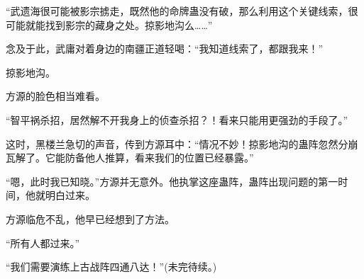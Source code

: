 \begin{this_body}
“武遗海很可能被影宗掳走，既然他的命牌蛊没有破，那么利用这个关键线索，很可能就能找到影宗的藏身之处。掠影地沟么……”

念及于此，武庸对着身边的南疆正道轻喝：“我知道线索了，都跟我来！”

掠影地沟。

方源的脸色相当难看。

“智平祸杀招，居然解不开我身上的侦查杀招？！看来只能用更强劲的手段了。”

这时，黑楼兰急切的声音，传到方源耳中：“情况不妙！掠影地沟的蛊阵忽然分崩瓦解了。它能防备他人推算，看来我们的位置已经暴露。”

“嗯，此时我已知晓。”方源并无意外。他执掌这座蛊阵，蛊阵出现问题的第一时间，他就明白过来。

方源临危不乱，他早已经想到了方法。

“所有人都过来。”

“我们需要演练上古战阵四通八达！”(未完待续。)

\end{this_body}

